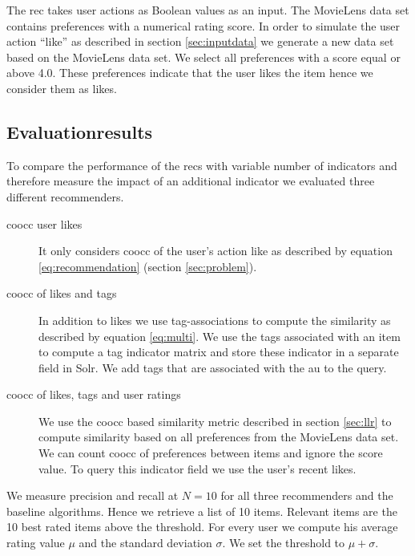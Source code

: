 The \gls{rec} takes user actions as Boolean values as an input. The MovieLens data set contains preferences with a numerical rating score. 
In order to simulate the user action ``like'' as described in section \ref{sec:inputdata} we generate a new data set based on the MovieLens data set. We select all preferences with a score equal or above 4.0. These \glspl{preference} indicate that the user likes the item hence we consider them as likes.

\subsection{Evaluationresults}
\label{sec:results}
To compare the performance of the \glspl{rec} with variable number of \glspl{indicator} and therefore measure the impact of an additional indicator we evaluated three different recommenders. 

\begin{description}
\item[\Gls{coocc} user likes] It only considers \gls{coocc} of the user's action \gls{like} as described by equation \ref{eq:recommendation} (section \ref{sec:problem}).
\item[\Gls{coocc} of likes and tags] In addition to likes we use tag-associations to compute the similarity as described by equation \ref{eq:multi}. We use the tags associated with an item to compute a tag \gls{indicator} matrix and store these indicator in a separate field in Solr. We add tags that are associated with the \gls{au} to the query.
\item[\Gls{coocc} of likes, tags and user ratings] We use the \gls{coocc} based similarity metric described in section \ref{sec:llr} to compute similarity based on all preferences from the MovieLens data set. We can count \gls{coocc} of preferences between items and ignore the score value. To query this \gls{indicator} field we use the user's recent likes.
\end{description}

We measure precision and recall at $N=10$ for all three recommenders and the baseline algorithms. Hence we retrieve a list of 10 items. Relevant items are the 10 best rated items above the threshold. For every user we compute his average rating value $\mu$ and the standard deviation $\sigma$. We set the threshold to $\mu + \sigma$.


